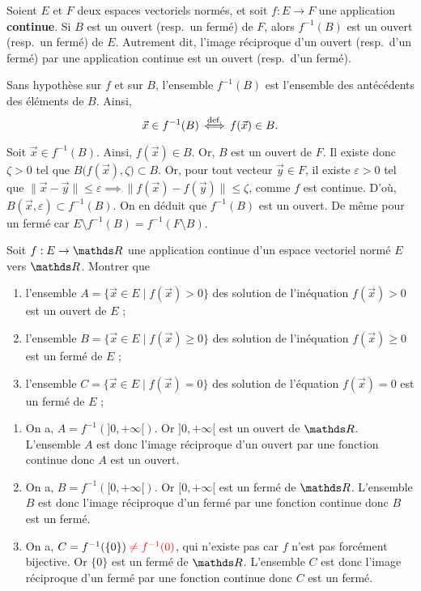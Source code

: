 \begin{prop}
	Soient $E$\/ et $F$\/ deux espaces vectoriels normés, et soit $f : E \to F$\/ une application \textbf{continue}.
	Si $B$ est un ouvert (resp.\ un fermé) de $F$, alors $f^{-1}(B)$ est un ouvert (resp.\ un fermé) de $E$.
	Autrement dit, l'image réciproque d'un ouvert (resp.\ d'un fermé) par une application continue est un ouvert (resp.\ d'un fermé).
\end{prop}

\begin{rap}
	Sans hypothèse sur $f$ et sur $B$, l'ensemble $f^{-1}(B)$ est l'ensemble des antécédents des éléments de $B$. Ainsi, \[
		\vec{x} \in f^{-1}(B) \mathop{\iff}^{\text{def.}} f(\vec{x}) \in B
	.\]
\end{rap}

\begin{prv}
	Soit $\vec{x} \in f^{-1}(B)$. Ainsi, $f(\vec{x}) \in B$.
	Or, $B$\/ est un ouvert de $F$. Il existe donc $\zeta > 0$ tel que $B\big(f(\vec{x}), \zeta\big) \subset B$. Or, pour tout vecteur $\vec{y} \in F$, il existe $\varepsilon > 0$\/ tel que $\|\vec{x} - \vec{y}\| \le \varepsilon \implies\|f(\vec{x}) - f(\vec{y})\| \le \zeta$, comme $f$\/ est continue.
	D'où, $B(\vec{x}, \varepsilon) \subset f^{-1}(B)$. On en déduit que $f^{-1}(B)$\/ est un ouvert.
	De même pour un fermé car $E \setminus f^{-1}(B) = f^{-1}(F \setminus B)$.
\end{prv}

\begin{exo}
	\begin{slshape}
		Soit $f : E \to  \R$\/ une application continue d'un espace vectoriel normé $E$ vers $\R$. Montrer que
		\begin{enumerate}
			\item l'ensemble $A = \{\vec{x} \in E  \mid f(\vec{x}) > 0\}$\/ des solution de l'inéquation $f(\vec{x}) > 0$ est un ouvert de $E$ ;
			\item l'ensemble $B = \{\vec{x} \in E  \mid f(\vec{x}) \ge 0\}$\/ des solution de l'inéquation $f(\vec{x}) \ge 0$ est un fermé de $E$ ;
			\item l'ensemble $C = \{\vec{x} \in E  \mid f(\vec{x}) = 0\}$\/ des solution de l'équation $f(\vec{x}) = 0$ est un fermé de $E$ ;
		\end{enumerate}
	\end{slshape}
	\begin{enumerate}
		\item On a, $A = f^{-1}(]0, +\infty[)$. Or $]0,+\infty[$\/ est un ouvert de $\R$. L'ensemble $A$ est donc l'image réciproque d'un ouvert par une fonction continue donc $A$ est un ouvert.
		\item On a, $B = f^{-1}([0, +\infty[)$. Or $[0,+\infty[$\/ est un fermé de $\R$. L'ensemble $B$ est donc l'image réciproque d'un fermé par une fonction continue donc $B$ est un fermé.
		\item On a, $C = f^{-1}(\{0\}) \color{red} \neq f^{-1}(0)$, qui n'existe pas car $f$ n'est pas forcément bijective. Or $\{0\}$\/ est un fermé de $\R$. L'ensemble $C$ est donc l'image réciproque d'un fermé par une fonction continue donc $C$ est un fermé.
	\end{enumerate}
\end{exo}

